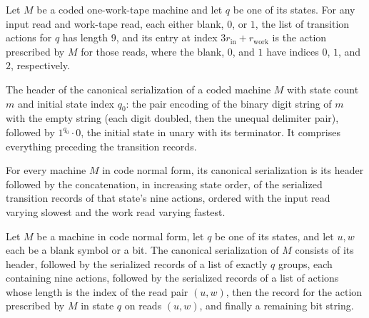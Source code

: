 \begin{lemma}
\label{Turing.universalActions_lookup}
\leanok
{}
Let $M$ be a coded one-work-tape machine and let $q$ be one of its states. For any input
read and work-tape read, each either blank, $0$, or $1$, the list of transition actions
for $q$ has length $9$, and its entry at index $3r_{\mathrm{in}}+r_{\mathrm{work}}$ is
the action prescribed by $M$ for those reads, where the blank, $0$, and $1$ have indices
$0$, $1$, and $2$, respectively.
\end{lemma}

\begin{definition}
\label{Turing.universalHeader}
\leanok
{}
The header of the canonical serialization of a coded machine $M$ with state
count $m$ and initial state index $q_0$: the pair encoding of the binary
digit string of $m$ with the empty string (each digit doubled, then the
unequal delimiter pair), followed by $1^{q_0} \cdot 0$, the initial state
in unary with its terminator.  It comprises everything preceding the
transition records.
\end{definition}

\begin{lemma}
\label{Turing.universal_serialization_actions}
\leanok
{}
For every machine $M$ in code normal form, its canonical serialization is its header
followed by the concatenation, in increasing state order, of the serialized transition
records of that state's nine actions, ordered with the input read varying slowest and
the work read varying fastest.
\end{lemma}

\begin{lemma}
\label{Turing.universal_lookup_parts}
\leanok
{}
Let $M$ be a machine in code normal form, let $q$ be one of its states, and let $u,w$
each be a blank symbol or a bit. The canonical serialization of $M$ consists of its
header, followed by the serialized records of a list of exactly $q$ groups, each
containing nine actions, followed by the serialized records of a list of actions whose
length is the index of the read pair $(u,w)$, then the record for the action prescribed
by $M$ in state $q$ on reads $(u,w)$, and finally a remaining bit string.
\end{lemma}

